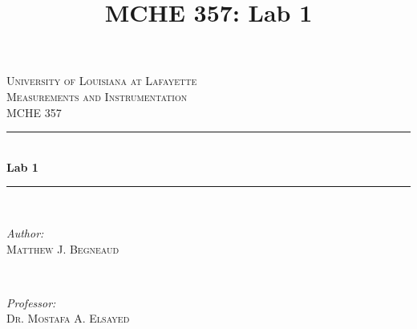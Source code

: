\documentclass[12pt]{article}
\title{MCHE 357: Lab 1}
\begin{document}




\begin{titlepage}

\newcommand{\HRule}{\rule{\linewidth}{0.5mm}} %

\center %
 

\textsc{\LARGE University of Louisiana at Lafayette}\\[1.5cm] %
\textsc{\Large Measurements and Instrumentation}\\[0.5cm] %
\textsc{\large MCHE 357}\\[0.5cm] %


\HRule \\[0.4cm]
{ \huge \bfseries Lab 1}\\[0.4cm] %
\HRule \\[1.5cm]
 

\begin{minipage}{0.4\textwidth}
\begin{flushleft} \large
\emph{Author:}\\
\textsc{Matthew J. Begneaud} \\%
\end{flushleft}
\end{minipage}
~
\begin{minipage}{0.4\textwidth}
\begin{flushright} \large
\emph{Professor:} \\
\textsc{Dr. Mostafa A. Elsayed} %
\end{flushright}
\end{minipage}\\[1.5cm]


\end{titlepage}
\end{document}
